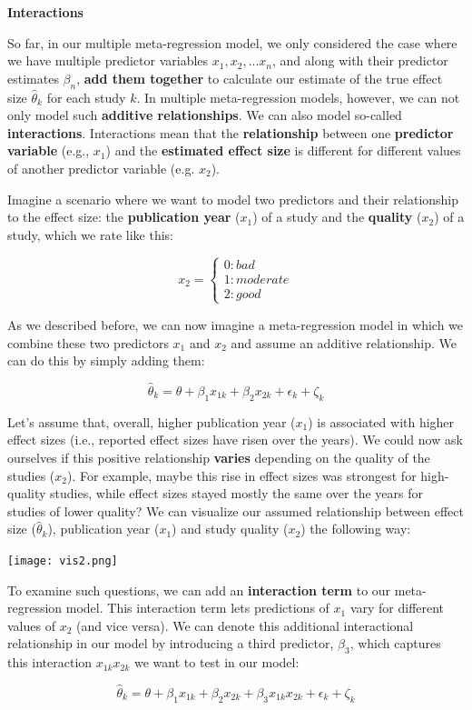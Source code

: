 \documentclass[]{book}
\begin{document}
\begin{rmdinfo}
\textbf{Interactions}

So far, in our multiple meta-regression model, we only considered the
case where we have multiple predictor variables \(x_1,x_2, ... x_n\),
and along with their predictor estimates \(\beta_n\), \textbf{add them
together} to calculate our estimate of the true effect size
\(\hat \theta_k\) for each study \(k\). In multiple meta-regression
models, however, we can not only model such \textbf{additive
relationships}. We can also model so-called \textbf{interactions}.
Interactions mean that the \textbf{relationship} between one
\textbf{predictor variable} (e.g., \(x_1\)) and the \textbf{estimated
effect size} is different for different values of another predictor
variable (e.g. \(x_2\)).

Imagine a scenario where we want to model two predictors and their
relationship to the effect size: the \textbf{publication year} (\(x_1\))
of a study and the \textbf{quality} (\(x_2\)) of a study, which we rate
like this:

\[\begin{equation}
  x_2 = \left \{\begin{array}{ll}
      0: bad
      \\1: moderate
      \\2: good
    \end{array}
  \right.
\end{equation}\]

As we described before, we can now imagine a meta-regression model in
which we combine these two predictors \(x_1\) and \(x_2\) and assume an
additive relationship. We can do this by simply adding them:

\[\hat \theta_k = \theta + \beta_1x_{1k} + \beta_2x_{2k} + \epsilon_k + \zeta_k\]

Let's assume that, overall, higher publication year (\(x_1\)) is
associated with higher effect sizes (i.e., reported effect sizes have
risen over the years). We could now ask ourselves if this positive
relationship \textbf{varies} depending on the quality of the studies
(\(x_2\)). For example, maybe this rise in effect sizes was strongest
for high-quality studies, while effect sizes stayed mostly the same over
the years for studies of lower quality? We can visualize our assumed
relationship between effect size (\(\hat \theta_k\)), publication year
(\(x_1\)) and study quality (\(x_2\)) the following way:

\texttt{[image: vis2.png]}

To examine such questions, we can add an \textbf{interaction term} to
our meta-regression model. This interaction term lets predictions of
\(x_1\) vary for different values of \(x_2\) (and vice versa). We can
denote this additional interactional relationship in our model by
introducing a third predictor, \(\beta_3\), which captures this
interaction \(x_{1k}x_{2k}\) we want to test in our model:

\[\hat \theta_k = \theta + \beta_1x_{1k} + \beta_2x_{2k} + \beta_3x_{1k}x_{2k}+ \epsilon_k + \zeta_k\]
\end{rmdinfo}
\end{document}
